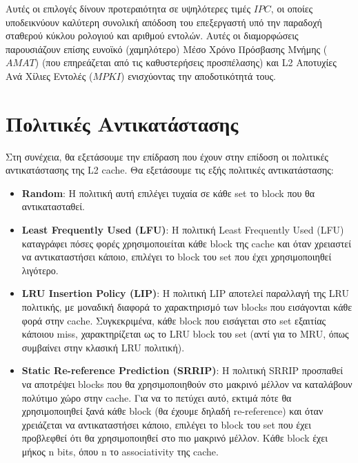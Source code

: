\documentclass{article}
\begin{document}
Αυτές οι επιλογές δίνουν προτεραιότητα σε υψηλότερες τιμές $IPC$, οι οποίες υποδεικνύουν καλύτερη συνολική απόδοση του επεξεργαστή υπό την παραδοχή σταθερού κύκλου ρολογιού και αριθμού εντολών. 
Αυτές οι διαμορφώσεις παρουσιάζουν επίσης ευνοϊκό (χαμηλότερο) Μέσο Χρόνο Πρόσβασης Μνήμης ($AMAT$) (που επηρεάζεται από τις καθυστερήσεις προσπέλασης) και L2 Αποτυχίες Ανά Χίλιες Εντολές ($MPKI$) ενισχύοντας την αποδοτικότητά τους. 

\section{Πολιτικές Αντικατάστασης}
Στη συνέχεια, θα εξετάσουμε την επίδραση που έχουν στην επίδοση οι πολιτικές αντικατάστασης της L2 cache.
Θα εξετάσουμε τις εξής πολιτικές αντικατάστασης:
\begin{itemize}
    \item \textbf{Random}: Η πολιτική αυτή επιλέγει τυχαία σε κάθε set το block που θα αντικατασταθεί.
    \item \textbf{Least Frequently Used (LFU)}: Η πολιτική Least Frequently Used (LFU) καταγράφει πόσες φορές χρησιμοποιείται κάθε block της cache και όταν χρειαστεί να αντικαταστήσει κάποιο, επιλέγει το block του set που έχει χρησιμοποιηθεί λιγότερο.
    \item \textbf{LRU Insertion Policy (LIP)}: Η πολιτική LIP αποτελεί παραλλαγή της LRU πολιτικής, με μοναδική διαφορά το χαρακτηρισμό των blocks που εισάγονται κάθε φορά στην cache. Συγκεκριμένα, κάθε block που εισάγεται στο set εξαιτίας κάποιου miss, χαρακτηρίζεται ως το LRU block του set (αντί για το MRU, όπως συμβαίνει στην κλασική LRU πολιτική).
    \item \textbf{Static Re-reference Prediction (SRRIP)}: Η πολιτική SRRIP προσπαθεί να αποτρέψει blocks που θα χρησιμοποιηθούν στο μακρινό μέλλον να καταλάβουν πολύτιμο χώρο στην cache. Για να το πετύχει αυτό, εκτιμά πότε θα χρησιμοποιηθεί ξανά κάθε block (θα έχουμε δηλαδή re-reference) και όταν χρειάζεται να αντικαταστήσει κάποιο, επιλέγει το block του set που έχει προβλεφθεί ότι θα χρησιμοποιηθεί στο πιο μακρινό μέλλον. Κάθε block έχει μήκος n bits, όπου n το associativity της cache.
\end{itemize}
\end{document}
